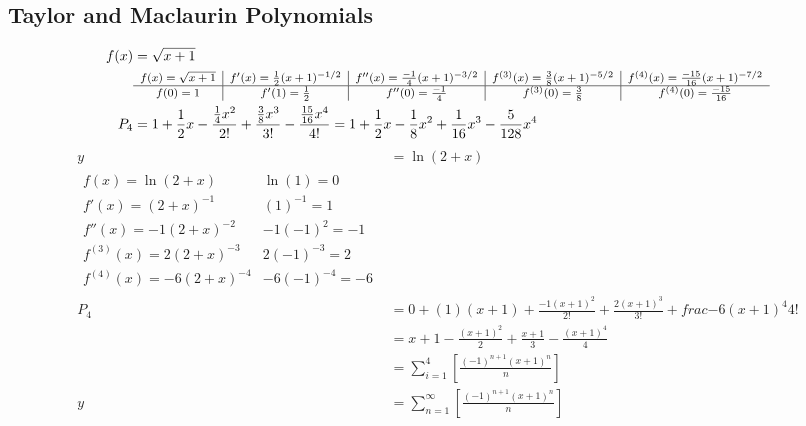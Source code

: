 \documentclass[12pt, A4]{article}
\begin{document}
	\subsection{Taylor and Maclaurin Polynomials}
		\begin{align*}
			f(x) &= \sqrt{x + 1} \\
				&\footnotesize\begin{array}{c|c|c|c|c}
					f(x) = \sqrt{x + 1} & f'(x) = \frac{1}{2}(x + 1)^{-1/2} & f''(x) = \frac{-1}{4}(x + 1)^{-3/2} & f^{(3)}(x) = \frac{3}{8}(x + 1)^{-5/2} & f^{(4)}(x) = \frac{-15}{16}(x + 1)^{-7/2}\\\hline
					f(0) = 1 & f'(1) = \frac{1}{2} & f''(0) = \frac{-1}{4} & f^{(3)}(0) = \frac{3}{8} & f^{(4)}(0) = \frac{-15}{16}
				\end{array} \\
			P_4 &= 1 + \frac{1}{2}x - \frac{\frac{1}{4}x^2}{2!} + \frac{\frac{3}{8}x^3}{3!} - \frac{\frac{15}{16}x^4}{4!} = 1 + \frac{1}{2}x - \frac{1}{8}x^2 + \frac{1}{16}x^3 - \frac{5}{128}x^4
		\end{align*}
		\begin{align*}
			y &= \ln(2 + x) \\ 
			\begin{array}{l|l}
				f(x) = \ln(2 + x) & \ln(1) = 0 \\
				f'(x) = (2 + x)^{-1} & (1)^{-1} = 1 \\
				f''(x) = -1(2 + x)^{-2} & -1(-1)^{2} = -1 \\
				f^{(3)}(x) = 2(2 + x)^{-3} & 2(-1)^{-3} = 2 \\
				f^{(4)}(x) = -6(2 + x)^{-4} & -6(-1)^{-4} = -6
			\end{array} \\
			P_4 &= 0 + (1)(x + 1) + \frac{-1(x + 1)^2}{2!} + \frac{2(x + 1)^3}{3!} + frac{-6(x + 1)^4}{4!} \\
				&= x + 1 - \frac{(x + 1)^2}{2} + \frac{x + 1}{3} - \frac{(x + 1)^4}{4} \\ 
				&= \sum_{i = 1}^4\left[\frac{(-1)^{n + 1}(x + 1)^n}{n}\right] \\
			y &= \sum_{n = 1}^\infty\left[\frac{(-1)^{n + 1}(x + 1)^n}{n}\right]
		\end{align*}
\end{document}
